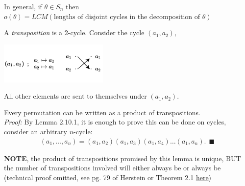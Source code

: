 In general, if $\theta\in S_{n}$ then $o(\theta)= LCM(\text{lengths of disjoint cycles in the decomposition of }\theta)$
\begin{definition}[Transposition]
A \textit{transposition} is a 2-cycle. Consider the cycle $(a_1,a_2)$,
\begin{center}
    \includegraphics[width=0.4\textwidth]{Figures/transposition_2cycle.pdf}
\end{center}
All other elements are sent to themselves under $(a_1,a_2)$.
\end{definition}

\begin{lemma}
Every permutation can be written as a product of transpositions. \steezybreak\\
\textit{Proof:} By Lemma 2.10.1, it is enough to prove this can be done on cycles, consider an arbitrary $n$-cycle:
\begin{align}
    (a_1, \dots, a_n)=(a_1,a_2)(a_1,a_3)(a_1,a_4)\dots(a_1,a_n). \ \ \blacksquare \nonumber
\end{align}
\end{lemma}
\textbf{NOTE}, the product of transpositions promised by this lemma is  unique, BUT the number of transpositions involved will either always be  or always be  (technical proof omitted, see pg. 79 of Herstein or Theorem 2.1 \href{https://kconrad.math.uconn.edu/blurbs/grouptheory/sign.pdf}{here})


